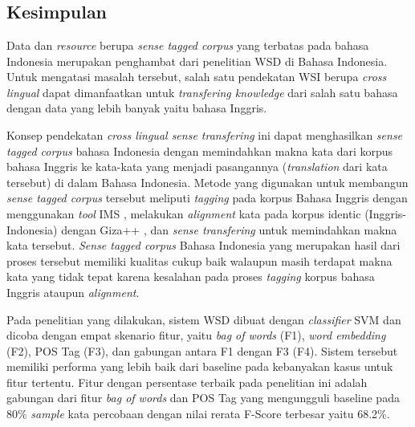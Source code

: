 \chapter{\babEnam}

\section{Kesimpulan}

Data dan \textit{resource} berupa \textit{sense tagged corpus} yang terbatas pada bahasa Indonesia merupakan penghambat dari penelitian WSD di Bahasa Indonesia. Untuk mengatasi masalah tersebut, salah satu pendekatan WSI berupa \textit{cross lingual} dapat dimanfaatkan untuk \textit{transfering knowledge} dari salah satu bahasa dengan data yang lebih banyak yaitu bahasa Inggris.

Konsep pendekatan \textit{cross lingual sense transfering} ini dapat menghasilkan \textit{sense tagged corpus} bahasa Indonesia dengan memindahkan makna kata dari korpus bahasa Inggris ke kata-kata yang menjadi pasangannya (\textit{translation} dari kata tersebut) di dalam Bahasa Indonesia. Metode yang digunakan untuk membangun \textit{sense tagged corpus} tersebut meliputi \textit{tagging} pada korpus Bahasa Inggris dengan menggunakan \textit{tool} IMS \citep{zhong2010makes}, melakukan \textit{alignment} kata pada korpus identic (Inggris-Indonesia) dengan Giza++ \citep{och03:asc}, dan \textit{sense transfering} untuk memindahkan makna kata tersebut. \textit{Sense tagged corpus} Bahasa Indonesia  yang merupakan hasil dari proses tersebut memiliki kualitas cukup baik walaupun masih terdapat makna kata yang tidak tepat karena kesalahan pada proses \textit{tagging} korpus bahasa Inggris ataupun \textit{alignment}.

Pada penelitian yang dilakukan, sistem WSD dibuat dengan \textit{classifier} SVM dan dicoba dengan empat skenario fitur, yaitu \textit{bag of words} (F1), \textit{word embedding} (F2), POS Tag (F3), dan gabungan antara F1 dengan F3 (F4). Sistem tersebut  memiliki performa yang lebih baik dari baseline pada kebanyakan kasus untuk fitur tertentu. Fitur dengan persentase terbaik pada penelitian ini adalah gabungan dari fitur \textit{bag of words} dan POS Tag yang mengungguli baseline pada 80\% \textit{sample} kata percobaan dengan nilai rerata F-Score terbesar yaitu 68.2\%.

